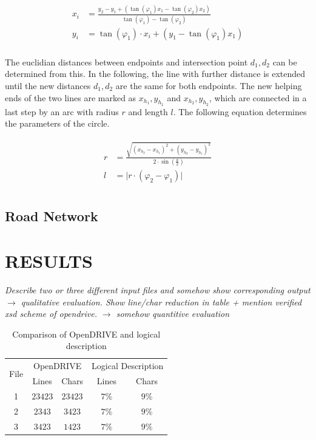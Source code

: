 \documentclass[a4paper, 10pt, conference]{ieeeconf}      %
\begin{document}
    \begin{align}
        \begin{split}
            x_i &= \frac{y_2 - y_1 + \left(\tan(\varphi_1) x_1 - \tan(\varphi_2) x_2\right)}{\tan(\varphi_1) - \tan(\varphi_2)} \\
            y_i &= \tan(\varphi_1) \cdot x_i+ \left(y_1 - \tan(\varphi_1) x_1\right)\\
        \end{split}     
    \end{align}

    The euclidian distances between endpoints and intersection point \(d_1, d_2\) can be determined from this. In the following, the line with further distance is extended until the new distances \(d_1, d_2\) are the same for both endpoints. The new helping ends of the two lines are marked as \(x_{h_1}, y_{h_1}\) and \(x_{h_2}, y_{h_2}\), which are connected in a last step by an arc with radius \(r\) and length \(l\). The following equation determines the parameters of the circle.

    \begin{align}
        \begin{split}           
        r &= \frac{\sqrt{\left(x_{h_2} - x_{h_1}\right)^2 + \left(y_{h_2} - y_{h_1}\right)^2}}{2 \cdot \sin\left(\frac{a}{2}\right)} \\
        l &= \vert r \cdot \left(\varphi_2 - \varphi_1\right) \vert \\  
        \end{split}
    \end{align}


\subsection{Road Network}

\clearpage %
\section{RESULTS}
\textit{Describe two or three different input files and somehow show corresponding output $\rightarrow$ qualitative evaluation. Show line/char reduction in table + mention verified xsd scheme of opendrive. $\rightarrow$ somehow quantitive evaluation}
\begin{table}[h]
\caption{Comparison of OpenDRIVE and logical description}
\label{tab_comparison}
\def\arraystretch{1.5}
\begin{center}
\begin{tabular}{c|cccc}
\multirow{2}{*}{File} & \multicolumn{2}{c}{OpenDRIVE} & \multicolumn{2}{c}{Logical Description}\\
& Lines & Chars & Lines & Chars \\
\hline
1 & $23423$ & $23423$& $7\%$ &$9\%$\\
2 & $2343$ & $3423$& $7\%$ &$9\%$\\
3 & $3423$ & $1423$& $7\%$ &$9\%$
\end{tabular}
\end{center}
\end{table}
\end{document}
